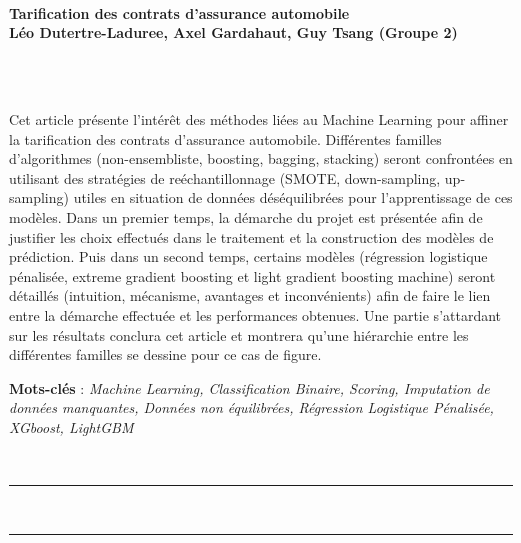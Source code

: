 \documentclass[french]{article}
\makeatletter
\def\vhrulefill#1{\leavevmode\leaders\hrule\@height#1\hfill \kern\z@}
\renewenvironment{abstract} %
 {\par\noindent\textbf{\abstractname}\ \ignorespaces\\}
 {\par\medskip}
\makeatother
\begin{document}
\noindent\begin{minipage}{\textwidth}

\ \\[30pt]

{\LARGE \bf Tarification des contrats d'assurance automobile} \\

{\large \bf Léo Dutertre-Laduree, 
            Axel Gardahaut, 
            Guy Tsang (Groupe 2)}



\end{minipage}

\



\null

\begin{mybox}
\begin{abstract}
Cet article présente l'intérêt des méthodes liées au Machine Learning pour affiner la tarification des contrats d'assurance automobile. Différentes familles d'algorithmes (non-ensembliste, boosting, bagging, stacking) seront confrontées en utilisant des stratégies de reéchantillonnage (SMOTE, down-sampling, up-sampling) utiles en situation de données déséquilibrées pour l'apprentissage de ces modèles. Dans un premier temps, la démarche du projet est présentée afin de justifier les choix effectués dans le traitement et la construction des modèles de prédiction. Puis dans un second temps, certains modèles (régression logistique pénalisée, extreme gradient boosting et light gradient boosting machine) seront détaillés (intuition, mécanisme, avantages et inconvénients) afin de faire le lien entre la démarche effectuée et les performances obtenues. Une partie s'attardant sur les résultats conclura cet article et montrera qu'une hiérarchie entre les différentes familles se dessine pour ce cas de figure.

\noindent \textbf{Mots-clés} : \emph{Machine Learning, Classification Binaire, Scoring, Imputation de données manquantes, Données non équilibrées, Régression Logistique Pénalisée, XGboost, LightGBM}
\end{abstract}
\end{mybox}


\

\noindent \vhrulefill{1.5pt} ~ ~ \vhrulefill{1.5pt}
\end{document}
